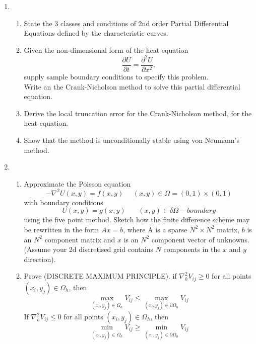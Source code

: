 \begin{enumerate}
\begin{enumerate}
					
	\end{enumerate}
	\item
		\begin{enumerate}
		\item
		State the 3 classes and conditions of 2nd order Partial Differential Equations defined by the characteristic curves.
		\item
		Given the non-dimensional form of the heat equation
		\[\frac{\partial U}{\partial t} = \frac{\partial^2 U}{\partial x^2},\]
		supply sample boundary conditions to specify this problem.\\
		Write an the Crank-Nicholson method to solve this partial differential equation.
		\item
		Derive the local truncation error for the Crank-Nicholson method, for the heat equation.\\
						
		\item
		Show that the method is unconditionally stable using von Neumann's method.
		
			
	\end{enumerate}
	\item
	\begin{enumerate}
		\item
		Approximate the Poisson equation 
		\[ -\nabla^2U(x,y)=f(x,y) \ \ \ \ \ \ (x,y) \in \Omega=(0,1)\times (0,1) \]
		with boundary conditions
		\[U(x,y) = g(x,y) \ \ \ \ \ \ \ \  (x,y)\in\delta\Omega-boundary \]
		using the five point method.  Sketch how the finite difference scheme may be 
		rewritten in the form $Ax=b$, where A is a sparse
		$N^2\times N^2$ matrix, $b$ is an $N^2$ component matrix and $x$ is an $N^2$
		component vector of unknowns.
		(Assume your 2d discretised grid contains $N$ components in the $x$ and $y$ direction).
		
		\item Prove (DISCRETE MAXIMUM PRINCIPLE).
		if $\nabla^2_hV_{ij}\geq 0$ for all points $(x_i,y_j) \in \Omega_h$, then
		\[ \max_{(x_i,y_j)\in\Omega_h}V_{ij}\leq  \max_{(x_i,y_j)\in\partial\Omega_h}V_{ij}\]
		If $\nabla^2_hV_{ij}\leq 0$ for all points $(x_i,y_j) \in \Omega_h$, then
		\[ \min_{(x_i,y_j)\in\Omega_h}V_{ij}\geq  \min_{(x_i,y_j)\in\partial\Omega_h}V_{ij}\]


\end{enumerate}
\end{enumerate}
